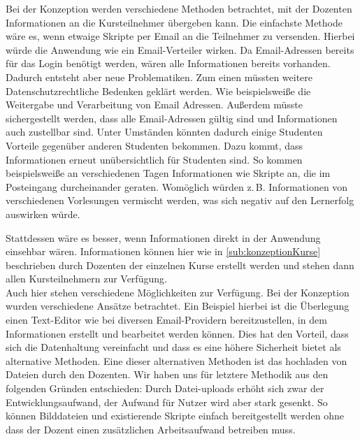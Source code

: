 Bei der Konzeption werden verschiedene Methoden betrachtet, mit der Dozenten Informationen an die Kursteilnehmer übergeben kann.
Die einfachste Methode wäre es, wenn etwaige Skripte per Email an die Teilnehmer zu versenden.
Hierbei würde die Anwendung wie ein Email-Verteiler wirken. Da Email-Adressen bereits für das Login benötigt werden, wären alle Informationen bereits vorhanden.
Dadurch entsteht aber neue Problematiken. Zum einen müssten weitere Datenschutzrechtliche Bedenken geklärt werden. Wie beispielsweiße die Weitergabe und Verarbeitung von Email Adressen. Außerdem müsste sichergestellt werden, dass alle Email-Adressen gültig sind und Informationen auch zustellbar sind. Unter Umständen könnten dadurch einige Studenten Vorteile gegenüber anderen Studenten bekommen.
Dazu kommt, dass Informationen erneut unübersichtlich für Studenten sind. So kommen beispielsweiße an verschiedenen Tagen Informationen wie Skripte an, die im Posteingang durcheinander geraten. Womöglich würden z.\,B. Informationen von verschiedenen Vorlesungen vermischt werden, was sich negativ auf den Lernerfolg auswirken würde.

Stattdessen wäre es besser, wenn Informationen direkt in der Anwendung einsehbar wären. Informationen können hier wie in \autoref{sub:konzeptionKurse} beschrieben durch Dozenten der einzelnen Kurse erstellt werden und stehen dann allen Kursteilnehmern zur Verfügung.\\
Auch hier stehen verschiedene Möglichkeiten zur Verfügung. Bei der Konzeption wurden verschiedene Ansätze betrachtet. Ein Beispiel hierbei ist die Überlegung einen Text-Editor wie bei diversen Email-Providern bereitzustellen, in dem Informationen erstellt und bearbeitet werden können. Dies hat den Vorteil, dass sich die Datenhaltung vereinfacht und dass es eine höhere Sicherheit bietet als alternative Methoden. Eine dieser alternativen Methoden ist das hochladen von Dateien durch den Dozenten. 
Wir haben uns für letztere Methodik aus den folgenden Gründen entschieden:
Durch Datei-uploads erhöht sich zwar der Entwicklungsaufwand, der Aufwand für Nutzer wird aber stark gesenkt. So können Bilddateien und existierende Skripte einfach bereitgestellt werden ohne dass der Dozent einen zusätzlichen Arbeitsaufwand betreiben muss.




